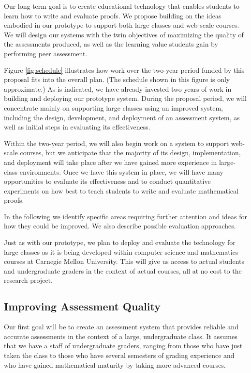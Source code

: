 \documentclass[12pt]{article}
\begin{document}
Our long-term goal is to create educational technology that enables
students to learn how to write and evaluate proofs.  We propose
building on the ideas embodied in our prototype to support both large
classes and web-scale courses.  We will design our systems with the
twin objectives of maximizing the quality of the assessments produced, as
well as the learning value students gain by performing peer assessment.

Figure \ref{fig:schedule} illustrates how work over the two-year
period funded by this proposal fits into the overall plan.  (The
schedule shown in this figure is only approximate.)  As is indicated,
we have already invested two years of work in building and deploying
our prototype system.  During the proposal period, we will concentrate
mainly on supporting large classes using an improved system, including
the design, development, and deployment of an assessment system,
as well as initial steps in evaluating its
effectiveness.

Within the two-year period,
we will also begin work on a system to support
web-scale courses, but we anticipate that the majority of its design,
implementation, and deployment will take place after we
have gained more experience in large-class environments.  Once we have
this system in place, we will have many opportunities to evaluate its
effectiveness and to conduct quantitative experiments on how best to
teach students to write and evaluate mathematical proofs.

In the following we identify specific areas requiring further
attention and ideas for how they could be improved.  We also describe
possible evaluation approaches.

Just as with our prototype, we plan to deploy and evaluate
the technology for large classes
as it is being developed within computer science and
mathematics courses at Carnegie Mellon University.  This will give us
access to actual students and undergraduate graders in the context of
actual courses, all at no cost to the research project.

\subsection{Improving Assessment Quality}

Our first goal will be to create an assessment system that provides
reliable and accurate assessments in the context of a large,
undergraduate class.  It assumes that we have a staff of undergraduate
graders, ranging from those who have just taken the class to those who
have several semesters of grading experience and who have gained
mathematical maturity by taking more advanced courses.
\end{document}
